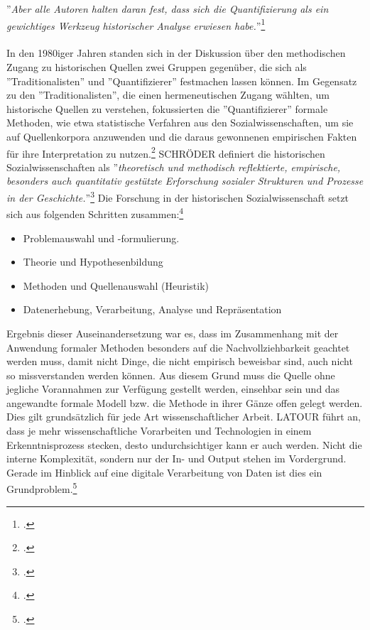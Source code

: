\documentclass[12pt,a4paper]{article}
\begin{document}
''\textit{Aber alle Autoren halten daran fest, dass sich die Quantifizierung als ein gewichtiges Werkzeug historischer Analyse erwiesen habe.}''\footcite[][S.191-206]{jarausch1985quantitative}
\\
\\
In den 1980iger Jahren standen sich in der Diskussion über den methodischen Zugang zu historischen Quellen zwei Gruppen gegenüber, die sich als ''Traditionalisten'' und ''Quantifizierer'' festmachen lassen können. Im Gegensatz zu den ''Traditionalisten'', die einen hermeneutischen Zugang wählten, um historische Quellen zu verstehen, fokussierten die ''Quantifizierer'' formale Methoden, wie etwa statistische Verfahren aus den Sozialwissenschaften, um sie auf Quellenkorpora anzuwenden und die daraus gewonnenen empirischen Fakten für ihre Interpretation zu nutzen.\footcite[][S.191-206]{jarausch1985quantitative} 
SCHRÖDER definiert die historischen Sozialwissenschaften als
 ''\textit{theoretisch und methodisch reflektierte, empirische, besonders auch quantitativ gestützte Erforschung sozialer Strukturen und Prozesse in der Geschichte.}''\footcite[][S.5]{schroder1988historische} Die Forschung in der historischen Sozialwissenschaft setzt sich aus folgenden Schritten zusammen:\footcite[][S.5-8]{schroder1988historische} 
 \begin{itemize}
 \item Problemauswahl und -formulierung.
 \item Theorie und Hypothesenbildung
 \item Methoden und Quellenauswahl (Heuristik)
 \item Datenerhebung, Verarbeitung, Analyse und Repräsentation
 \end{itemize}
Ergebnis dieser Auseinandersetzung war es, dass im Zusammenhang mit der Anwendung formaler Methoden besonders auf die Nachvollziehbarkeit geachtet werden muss, damit nicht Dinge, die nicht empirisch beweisbar sind, auch nicht so missverstanden werden können. Aus diesem Grund muss die Quelle ohne jegliche Vorannahmen zur Verfügung gestellt werden, einsehbar sein und das angewandte formale Modell bzw. die Methode in ihrer Gänze offen gelegt werden. Dies gilt grundsätzlich für jede Art wissenschaftlicher Arbeit. LATOUR führt an, dass je mehr wissenschaftliche Vorarbeiten und Technologien in einem Erkenntnisprozess stecken, desto undurchsichtiger kann er auch werden. Nicht die interne Komplexität, sondern nur der In- und Output stehen im Vordergrund. Gerade im Hinblick auf eine digitale Verarbeitung von Daten ist dies ein Grundproblem.\footcite[][S.309]{latour1999pandora} 
\end{document}
